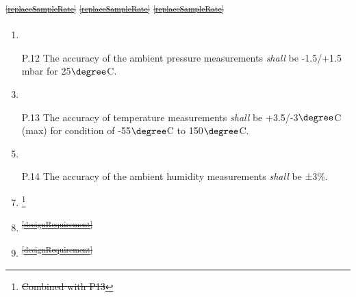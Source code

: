 \documentclass[a4paper,12pt,twoside]{article}
\providecommand{\DIFdeltex}[1]{{\protect\color{red}\sout{#1}}}                      %
\providecommand{\DIFaddbegin}{} %
\providecommand{\DIFaddend}{} %
\providecommand{\DIFdelbegin}{} %
\providecommand{\DIFdelend}{} %
\providecommand{\DIFdel}[1]{\texorpdfstring{\DIFdeltex{#1}}{}} %
\newcommand{\DIFscaledelfig}{0.5}
\newlength{\DIFdelgraphicswidth} %
\newlength{\DIFdelgraphicsheight} %
\newcommand{\DIFaddincludegraphics}[2][]{{\color{blue}\fbox{\DIFOincludegraphics[#1]{#2}}}} %
\newcommand{\DIFdelincludegraphics}[2][]{%
\sbox{\DIFdelgraphicsbox}{\DIFOincludegraphics[#1]{#2}}%
\settoboxwidth{\DIFdelgraphicswidth}{\DIFdelgraphicsbox} %
\settoboxtotalheight{\DIFdelgraphicsheight}{\DIFdelgraphicsbox} %
\scalebox{\DIFscaledelfig}{%
\parbox[b]{\DIFdelgraphicswidth}{\usebox{\DIFdelgraphicsbox}\\[-\baselineskip] \rule{\DIFdelgraphicswidth}{0em}}\llap{\resizebox{\DIFdelgraphicswidth}{\DIFdelgraphicsheight}{%
\setlength{\unitlength}{\DIFdelgraphicswidth}%
\begin{picture}(1,1)%
\thicklines\linethickness{2pt} %
{\color[rgb]{1,0,0}\put(0,0){\framebox(1,1){}}}%
{\color[rgb]{1,0,0}\put(0,0){\line( 1,1){1}}}%
{\color[rgb]{1,0,0}\put(0,1){\line(1,-1){1}}}%
\end{picture}%
}\hspace*{3pt}}} %
} %
\DeclareRobustCommand{\DIFaddbegin}{\DIFOaddbegin \let\includegraphics\DIFaddincludegraphics} %
\DeclareRobustCommand{\DIFaddend}{\DIFOaddend \let\includegraphics\DIFOincludegraphics} %
\DeclareRobustCommand{\DIFdelbegin}{\DIFOdelbegin \let\includegraphics\DIFdelincludegraphics} %
\DeclareRobustCommand{\DIFdelend}{\DIFOaddend \let\includegraphics\DIFOincludegraphics} %
\begin{document}
\DIFdel{\textsuperscript{\ref{replaceSampleRate}}
    }%
\DIFdel{\textsuperscript{\ref{replaceSampleRate}}
    }%
\DIFdel{\textsuperscript{\ref{replaceSampleRate}}
    }\DIFdelend \DIFaddbegin \begin{enumerate}
    \DIFaddend %
    \DIFdelbegin %
\item%
\DIFdelend \DIFaddbegin \item[P.12] \DIFaddend The accuracy of the ambient pressure measurements \textit{shall} be -1.5/+1.5 mbar for 25$\degree$C.
    \DIFdelbegin %
\item%
\DIFdelend \DIFaddbegin \item[P.13] \DIFaddend The accuracy of temperature measurements \textit{shall} be +3.5/-3$\degree$C (max) for condition of -55$\degree$C to 150$\degree$C.
    \DIFdelbegin %
\item%
\DIFdelend \DIFaddbegin \item[P.14] \DIFaddend The accuracy of the ambient humidity measurements \textit{shall} be ±3\%. \cite{Humiditysensor}
    \DIFdelbegin %
\item%
\footnote{\DIFdel{Combined with P13}%
}
\addtocounter{footnote}{-1}%
\item%
\DIFdel{\textsuperscript{\ref{designRequirement}}
    }%
\item%
\DIFdel{\textsuperscript{\ref{designRequirement}}
}
\end{enumerate}
\end{document}
